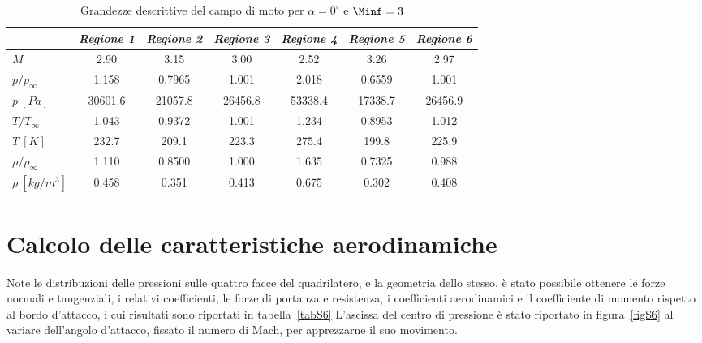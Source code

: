 \begin{table} [!h]\centering {}
\begin{tabular}{l  c  c c c c c}
\toprule
  & \emph{Regione 1}& \emph{Regione 2}& \emph{Regione 3}& \emph{Regione 4}& \emph{Regione 5}& \emph{Regione 6}   \\ 
\midrule
$M$	&	2.90	&	3.15	&	3.00	&	2.52	&	3.26	&	2.97	\\
$p/p_{\infty}$ &   1.158	&	0.7965	&	1.001	&	2.018	&	0.6559	&	1.001	\\
$p \ [\si{Pa}]$	&	30601.6	&	21057.8	&	26456.8	&	53338.4	&	17338.7	&	26456.9	\\
$T/T_{\infty}$ &  1.043	&	0.9372	&	1.001	&	1.234	&	0.8953	&	1.012	\\
$T \ [K]$	&	232.7	&	209.1	&	223.3	&	275.4	&	199.8	&	225.9	\\
$\rho/\rho_{\infty}$ & 1.110	&	0.8500	&	1.000	&	1.635	&	0.7325	&	0.988	\\
$\rho \ [kg/m^3]$	&	0.458	&	0.351	&	0.413	&	0.675	&	0.302	&	0.408	\\
\bottomrule
\end{tabular}
\caption {\footnotesize Grandezze descrittive del campo di moto per $\alpha=0^\circ$ e $\Minf=3$}
\label{tabS5}
\end{table}

\section{Calcolo delle caratteristiche aerodinamiche}

Note le distribuzioni delle pressioni sulle quattro facce del quadrilatero, e la geometria dello stesso, è stato possibile ottenere le forze normali e tangenziali, i relativi coefficienti, le forze di portanza e resistenza, i coefficienti aerodinamici e il coefficiente di momento rispetto al bordo d'attacco, i cui risultati sono riportati in tabella~\vref{tabS6}
L'ascissa del centro di pressione è stato riportato in figura~\vref{figS6} al variare dell'angolo d'attacco, fissato il numero di Mach, per apprezzarne il suo movimento.

